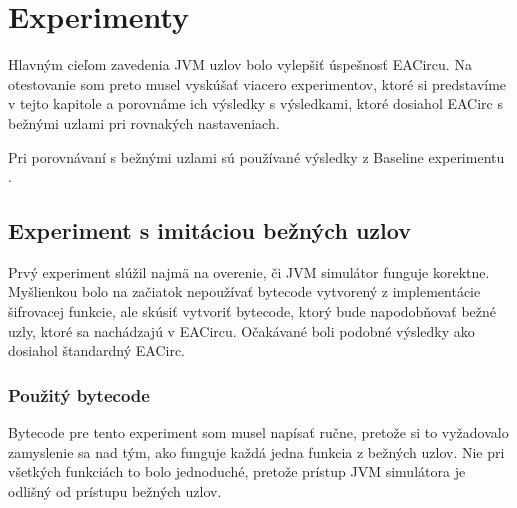 \chapter{Experimenty}
\label{chap:experiments}

Hlavným cieľom zavedenia JVM uzlov bolo vylepšiť úspešnosť EACircu. Na otestovanie som preto musel vyskúšať viacero experimentov, ktoré si predstavíme v tejto kapitole a porovnáme ich výsledky s výsledkami, ktoré dosiahol EACirc s bežnými uzlami pri rovnakých nastaveniach. 

Pri porovnávaní s bežnými uzlami sú používané výsledky z Baseline experimentu \cite{baseline-experiment}. 

\section{Experiment s imitáciou bežných uzlov}
\label{sec:exp1}

Prvý experiment slúžil najmä na overenie, či JVM simulátor funguje korektne. Myšlienkou bolo na začiatok nepoužívať bytecode vytvorený z implementácie šifrovacej funkcie, ale skúsiť vytvoriť bytecode, ktorý bude napodobňovať bežné uzly, ktoré sa nachádzajú v EACircu. Očakávané boli podobné výsledky ako dosiahol štandardný EACirc.

\subsection{Použitý bytecode}
\label{subsec:exp1-bytecode}

Bytecode pre tento experiment som musel napísať ručne, pretože si to vyžadovalo zamyslenie sa nad tým, ako funguje každá jedna funkcia z bežných uzlov. Nie pri všetkých funkciách to bolo jednoduché, pretože prístup JVM simulátora je odlišný od prístupu bežných uzlov. 

